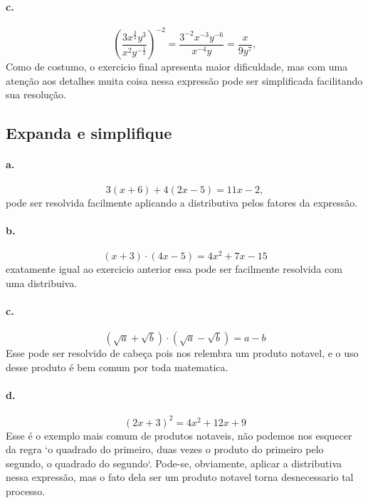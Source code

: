 	\paragraph{c.}
	\begin{equation}
	\left(\frac{3x^{\frac{3}{2}}y^3}{x^2y^{-\frac{1}{2}}}\right)^{-2} = \frac{3^{-2}x^{-3}y^{-6}}{x^{-4}y} = \frac{x}{9y^7},
	\end{equation}
	Como de costumo, o exercicio final apresenta maior dificuldade, mas com uma atenção aos detalhes muita coisa nessa expressão pode ser simplificada facilitando sua resolução.


\subsection{Expanda e simplifique}
	
	\paragraph{a.}
	\begin{equation}
	3(x+6)+4(2x-5) = 11x - 2,
	\end{equation}
	pode ser resolvida facilmente aplicando a distributiva pelos fatores da expressão.

	\paragraph{b.}
	\begin{equation}
	(x+3)\cdot(4x-5) = 4x^2 + 7x - 15
	\end{equation}
	exatamente igual ao exercicio anterior essa pode ser facilmente resolvida com uma distribuiva.

	\paragraph{c.}
	\begin{equation}
	(\sqrt{a} + \sqrt{b})\cdot(\sqrt{a} - \sqrt{b}) = a -b
	\end{equation}
	Esse pode ser resolvido de cabeça pois nos relembra um produto notavel, e o uso desse produto é bem comum por toda matematica.

	\paragraph{d.}
	\begin{equation}
	(2x+3)^2 = 4x^2+12x+9
	\end{equation}
	Esse é o exemplo mais comum de produtos notaveis, não podemos nos esquecer da regra `o quadrado do primeiro, duas vezes o produto do primeiro pelo segundo, o quadrado do segundo`. Pode-se, obviamente, aplicar a distributiva nessa expressão, mas o fato dela ser um produto notavel torna desnecessario tal processo.

